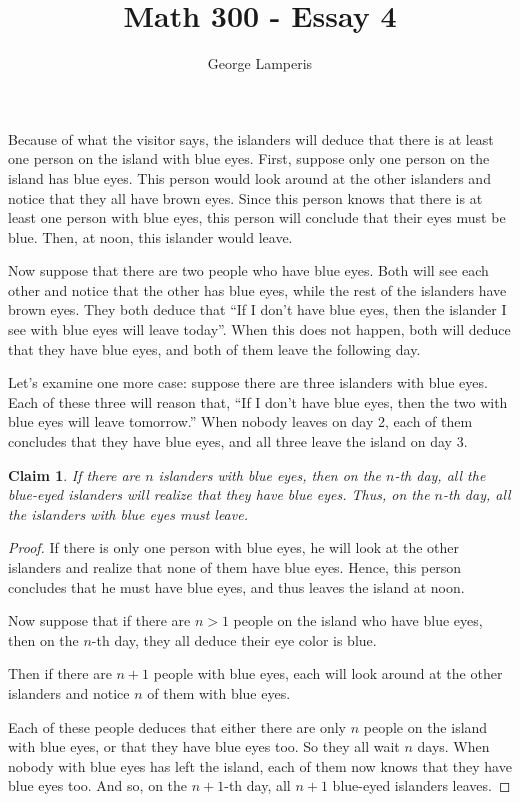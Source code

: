 \documentclass[12pt]{article}
\title{Math 300 - Essay 4}
\author{George Lamperis}
\date{}
\theoremstyle{mystyle}
\newtheorem*{claim}{Claim}
\begin{document}
\maketitle

Because of what the visitor says, the islanders will deduce that there is at
least one person on the island with blue eyes. First, suppose only one person on
the island has blue eyes. This person would look around at the other islanders
and notice that they all have brown eyes. Since this person knows that there is 
at least one person with blue eyes, this person will conclude that their eyes
must be blue. Then, at noon, this islander would leave.

Now suppose that there are two people who have blue eyes. Both will see each
other and notice that the other has blue eyes, while the rest of the islanders
have brown eyes. They both deduce that ``If I don't have blue eyes, then the
islander I see with blue eyes will leave today''. When this does not happen,
both will deduce that they have blue eyes, and both of them leave the following
day.

Let's examine one more case: suppose there are three islanders with blue eyes.
Each of these three will reason that, ``If I don't have blue eyes, then the
two with blue eyes will leave tomorrow.'' When nobody leaves on day 2, each of
them concludes that they have blue eyes, and all three leave the island on day
3.

\begin{claim}
  If there are $n$ islanders with blue eyes, then on the $n$-th day, all the
  blue-eyed islanders will realize that they have blue eyes. Thus, on the $n$-th
  day, all the islanders with blue eyes must leave.
\end{claim}
\begin{proof}
  If there is only one person with blue eyes, he will look at the other
  islanders and realize that none of them have blue eyes. Hence, this person
  concludes that he must have blue eyes, and thus leaves the island at noon.
  
  Now suppose that if there are $n > 1$ people on the island who have blue eyes,
  then on the $n$-th day, they all deduce their eye color is blue.
  
  Then if there are $n+1$ people with blue eyes, each will look around at the
  other islanders and notice $n$ of them with blue eyes.
  
  Each of these people deduces that either there are only $n$ people on the
  island with blue eyes, or that they have blue eyes too. So they all wait $n$
  days. When nobody with blue eyes has left the island, each of them now knows
  that they have blue eyes too. And so, on the $n+1$-th day, all $n+1$ blue-eyed
  islanders leaves.
\end{proof}
\end{document}
